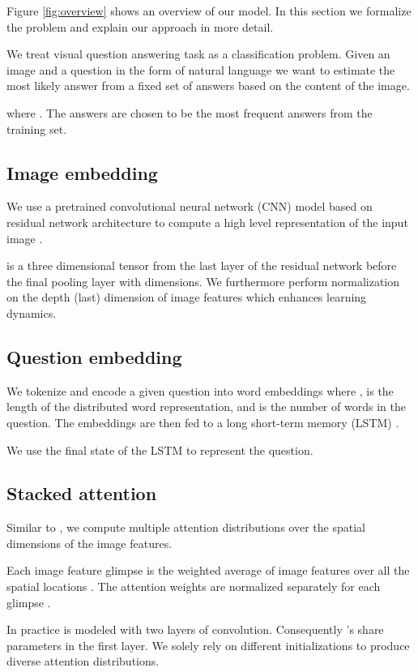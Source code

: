 \documentclass[10pt,twocolumn,letterpaper]{article}
\begin{document}
Figure \ref{fig:overview} shows an overview of our model. In this section we formalize the problem and explain our approach in more detail.

We treat visual question answering task as a classification problem. Given an image  and a question  in the form of natural language we want to estimate the most likely answer  from a fixed set of answers  based on the content of the image.

where . The answers are chosen to be the most frequent answers from the training set.

\subsection{Image embedding}
We use a pretrained convolutional neural network (CNN) model based on residual network architecture \cite{Krizhevsky2012ImageNetCW} to compute a high level representation  of the input image .

 is a three dimensional tensor from the last layer of the residual network \cite{He2016DeepRL} before the final pooling layer with  dimensions. We furthermore perform  normalization on the depth (last) dimension of image features which enhances learning dynamics.

\subsection{Question embedding}
We tokenize and encode a given question  into word embeddings  where ,  is the length of the distributed word representation, and  is the number of words in the question. The embeddings are then fed to a long short-term memory (LSTM) \cite{Hochreiter1997LongSM}.

We use the final state of the LSTM to represent the question. 

\subsection{Stacked  attention}
Similar to \cite{Yang2016StackedAN}, we compute multiple attention distributions over the spatial dimensions of the image features.

Each image feature glimpse  is the weighted average of image features  over all the spatial locations . The attention weights  are normalized separately for each glimpse . 

In practice  is modeled with two layers of convolution. Consequently 's share parameters in the first layer.
We solely rely on different initializations to produce diverse attention distributions. 
\end{document}
